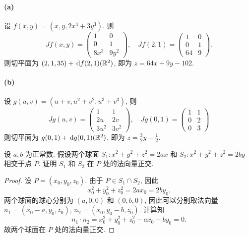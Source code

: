 \documentclass{article}
\begin{document}
\begin{solution}
	\paragraph{(a)} 设 $f(x,y) = (x,y,2x^4 + 3y^3)$. 则
	\[ Jf(x,y) = \begin{pmatrix}
		1 & 0 \\
		0 & 1 \\
		8x^3 & 9y^2
	\end{pmatrix}, \quad 
	Jf(2,1) = \begin{pmatrix}
		1 & 0 \\
		0 & 1 \\
		64 & 9
	\end{pmatrix}. \]
	则切平面为 $(2,1,35) + \,\mathrm{d} f(2,1)(\mathbb{R}^2)$, 即为 $z = 64x + 9y -102$. 

	\paragraph{(b)} 设 $g(u, v) = (u+v, u^2+v^2, u^3+v^3)$, 则
	\[ Jg(u, v) = \begin{pmatrix}
		1 & 1 \\
		2u & 2v \\
		3u^2 & 3v^2
	\end{pmatrix}, \quad 
	Jg(0,1) = \begin{pmatrix}
		1 & 1 \\
		0 & 2 \\
		0 & 3
	\end{pmatrix} \]
	则切平面为 $g(0,1) + \,\mathrm{d} g(0,1)(\mathbb{R}^2)$, 即为 $z = \frac{3}{2}y-\frac{1}{2}$. 
\end{solution}



\begin{problem}
  设 $a,b$ 为正常数. 假设两个球面 $S_1:x^2+y^2+z^2=2ax$ 和 $S_2:x^2+y^2+z^2=2by$ 相交于点 $P$. 证明 $S_1$ 和 $S_2$ 在 $P$ 处的法向量正交.
\end{problem}

\begin{proof}
	设 $P = (x_0,y_0,z_0)$. 由于 $P \in S_1 \cap S_2$, 因此
	\[ x_0^2+y_0^2+z_0^2 = 2ax_0 = 2by_0. \]
	两个球面的球心分别为 $(a,0,0)$ 和 $(0,b,0)$, 因此可以分别取法向量 $n_1 = (x_0-a,y_0,z_0)$, $n_2 = (x_0,y_0-b,z_0)$. 计算知
	\[ n_1 \cdot n_2 = x_0^2+y_0^2+z_0^2-ax_0-by_0 = 0. \]
	故两个球面在 $P$ 处的法向量正交.
\end{proof}
\end{document}
